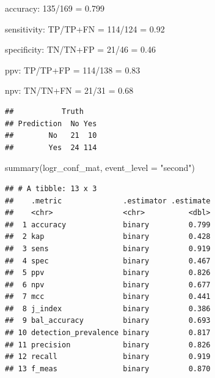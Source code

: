 \documentclass[
]{article}
\newenvironment{Shaded}{\begin{snugshade}}{\end{snugshade}}
\newcommand{\AttributeTok}[1]{\textcolor[rgb]{0.77,0.63,0.00}{#1}}
\newcommand{\DecValTok}[1]{\textcolor[rgb]{0.00,0.00,0.81}{#1}}
\newcommand{\FunctionTok}[1]{\textcolor[rgb]{0.00,0.00,0.00}{#1}}
\newcommand{\NormalTok}[1]{#1}
\newcommand{\OtherTok}[1]{\textcolor[rgb]{0.56,0.35,0.01}{#1}}
\newcommand{\SpecialCharTok}[1]{\textcolor[rgb]{0.00,0.00,0.00}{#1}}
\newcommand{\StringTok}[1]{\textcolor[rgb]{0.31,0.60,0.02}{#1}}
\begin{document}
accuracy: 135/169 = 0.799

sensitivity: TP/TP+FN = 114/124 = 0.92

specificity: TN/TN+FP = 21/46 = 0.46

ppv: TP/TP+FP = 114/138 = 0.83

npv: TN/TN+FN = 21/31 = 0.68

\begin{Shaded}
\end{Shaded}

\begin{verbatim}
##           Truth
## Prediction  No Yes
##        No   21  10
##        Yes  24 114
\end{verbatim}

\begin{Shaded}
\begin{Highlighting}[]
\FunctionTok{summary}\NormalTok{(logr\_conf\_mat, }\AttributeTok{event\_level =} \StringTok{"second"}\NormalTok{)}
\end{Highlighting}
\end{Shaded}

\begin{verbatim}
## # A tibble: 13 x 3
##    .metric              .estimator .estimate
##    <chr>                <chr>          <dbl>
##  1 accuracy             binary         0.799
##  2 kap                  binary         0.428
##  3 sens                 binary         0.919
##  4 spec                 binary         0.467
##  5 ppv                  binary         0.826
##  6 npv                  binary         0.677
##  7 mcc                  binary         0.441
##  8 j_index              binary         0.386
##  9 bal_accuracy         binary         0.693
## 10 detection_prevalence binary         0.817
## 11 precision            binary         0.826
## 12 recall               binary         0.919
## 13 f_meas               binary         0.870
\end{verbatim}
\end{document}

